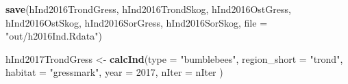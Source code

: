 \documentclass[]{article}
\newenvironment{Shaded}{\begin{snugshade}}{\end{snugshade}}
\newcommand{\KeywordTok}[1]{\textcolor[rgb]{0.13,0.29,0.53}{\textbf{#1}}}
\newcommand{\DataTypeTok}[1]{\textcolor[rgb]{0.13,0.29,0.53}{#1}}
\newcommand{\DecValTok}[1]{\textcolor[rgb]{0.00,0.00,0.81}{#1}}
\newcommand{\StringTok}[1]{\textcolor[rgb]{0.31,0.60,0.02}{#1}}
\newcommand{\NormalTok}[1]{#1}
\begin{document}
\begin{Shaded}
\begin{Highlighting}[]
\KeywordTok{save}\NormalTok{(hInd2016TrondGress, hInd2016TrondSkog, hInd2016OstGress, hInd2016OstSkog, hInd2016SorGress, hInd2016SorSkog, }\DataTypeTok{file =} \StringTok{"out/h2016Ind.Rdata"}\NormalTok{)}
\end{Highlighting}
\end{Shaded}

\begin{Shaded}
\begin{Highlighting}[]
\NormalTok{hInd2017TrondGress <-}\StringTok{ }\KeywordTok{calcInd}\NormalTok{(}\DataTypeTok{type =} \StringTok{"bumblebees"}\NormalTok{,}
                              \DataTypeTok{region_short =} \StringTok{"trond"}\NormalTok{,}
                              \DataTypeTok{habitat =} \StringTok{"gressmark"}\NormalTok{,}
                              \DataTypeTok{year =} \DecValTok{2017}\NormalTok{,}
                              \DataTypeTok{nIter =}\NormalTok{ nIter}
\NormalTok{                              )}
       

\end{Highlighting}
\end{Shaded}
\end{document}
